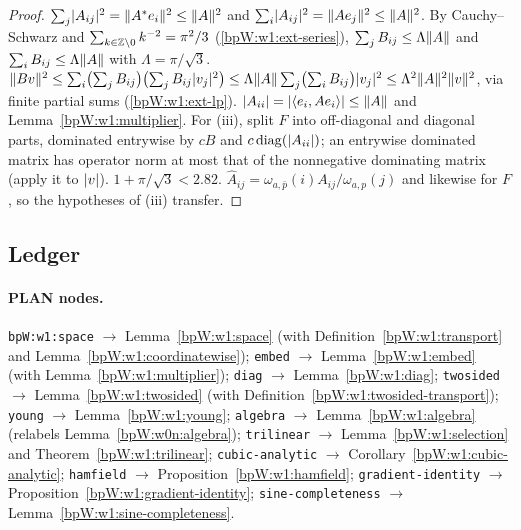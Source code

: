 \begin{proof}
\label{stepW:w1:rows}
$\sum_j\lvert A_{ij}\rvert^2=\lVert A^*e_i\rVert^2\le\lVert A\rVert^2$ and $\sum_i\lvert A_{ij}\rvert^2=\lVert Ae_j\rVert^2\le\lVert A\rVert^2$. By
Cauchy--Schwarz and $\sum_{k\in\mathbb{Z}\setminus0}k^{-2}=\pi^2/3$ (\ref{bpW:w1:ext-series}),
$\sum_jB_{ij}\le\Lambda\lVert A\rVert$ and $\sum_iB_{ij}\le\Lambda\lVert A\rVert$ with $\Lambda=\pi/\sqrt3$.
\label{stepW:w1:schurtest}
$\lVert Bv\rVert^2\le\sum_i\bigl(\sum_jB_{ij}\bigr)\bigl(\sum_jB_{ij}\lvert v_j\rvert^2\bigr)\le\Lambda\lVert A\rVert\sum_j\bigl(\sum_iB_{ij}\bigr)
\lvert v_j\rvert^2\le\Lambda^2\lVert A\rVert^2\lVert v\rVert^2$, via finite partial sums (\ref{bpW:w1:ext-lp}).
\label{stepW:w1:diagcomb}
$\lvert A_{ii}\rvert=\lvert \langle e_i,Ae_i\rangle\rvert\le\lVert A\rVert$ and Lemma~\ref{bpW:w1:multiplier}. For (iii), split $F$ into
off-diagonal and diagonal parts, dominated entrywise by $cB$ and $c\,\mathrm{diag}(\lvert A_{ii}\rvert)$; an entrywise
dominated matrix has operator norm at most that of the nonnegative dominating matrix (apply it to $\lvert v\rvert$).
$1+\pi/\sqrt3<2.82$.
\label{stepW:w1:schurweights}
$\hat A_{ij}=\omega_{a,\bar p}(i)A_{ij}/\omega_{a,p}(j)$ and likewise for $F$, so the hypotheses of (iii) transfer.
\end{proof}

\subsection{Ledger}\label{bpW:w1:ledger}

\paragraph{PLAN nodes.}
\texttt{bpW:w1:space} $\to$ Lemma~\ref{bpW:w1:space} (with Definition~\ref{bpW:w1:transport} and
Lemma~\ref{bpW:w1:coordinatewise}); \texttt{embed} $\to$ Lemma~\ref{bpW:w1:embed} (with
Lemma~\ref{bpW:w1:multiplier}); \texttt{diag} $\to$ Lemma~\ref{bpW:w1:diag}; \texttt{twosided} $\to$
Lemma~\ref{bpW:w1:twosided} (with Definition~\ref{bpW:w1:twosided-transport}); \texttt{young} $\to$
Lemma~\ref{bpW:w1:young}; \texttt{algebra} $\to$ Lemma~\ref{bpW:w1:algebra} (relabels Lemma~\ref{bpW:w0n:algebra});
\texttt{trilinear} $\to$ Lemma~\ref{bpW:w1:selection} and Theorem~\ref{bpW:w1:trilinear}; \texttt{cubic-analytic}
$\to$ Corollary~\ref{bpW:w1:cubic-analytic}; \texttt{hamfield} $\to$ Proposition~\ref{bpW:w1:hamfield};
\texttt{gradient-identity} $\to$ Proposition~\ref{bpW:w1:gradient-identity}; \texttt{sine-completeness} $\to$
Lemma~\ref{bpW:w1:sine-completeness}.

